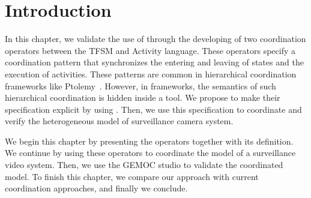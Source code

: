 \section{Introduction}
In this chapter, we validate the use of \bcool through the developing of two coordination operators between the TFSM and Activity language. These operators specify a coordination pattern that synchronizes the entering and leaving of states and the execution of activities. These patterns are common in hierarchical coordination frameworks like Ptolemy~\cite{giraultbib}. However, in frameworks, the semantics of such hierarchical coordination is hidden inside a tool. We propose to make their specification explicit by using \bcool. Then, we use this specification to coordinate and verify the heterogeneous model of surveillance camera system. 

We begin this chapter by presenting the operators together with its \bcool definition. We continue by using these operators to coordinate the model of a surveillance video system. Then, we use the GEMOC studio to validate the coordinated model. To finish this chapter, we compare our approach with current coordination approaches, and finally we conclude.  